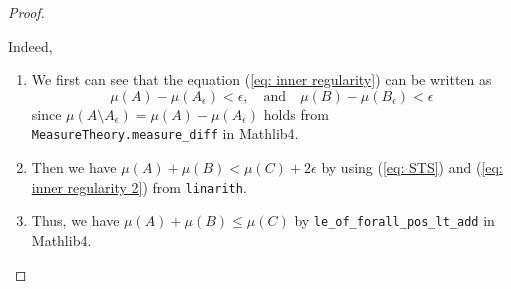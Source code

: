 \begin{proof}
\begin{enumerate}
\begin{enumerate}
            Indeed,
            \begin{enumerate}
            \item
              We first can see that the equation (\ref{eq: inner regularity}) can be written as
              \begin{equation}
                \mu(A)-\mu(A_\epsilon) < \epsilon, \quad \text{and} \quad \mu(B) - \mu(B_\epsilon) < \epsilon
                \label{eq: inner regularity 2}
              \end{equation}
              since \(\mu(A\setminus A_\epsilon) = \mu(A)-\mu(A_\epsilon)\) holds from \texttt{MeasureTheory.measure\_diff} in Mathlib4.

            \item Then we have \(\mu(A) + \mu(B) < \mu(C) + 2\epsilon\) by using (\ref{eq: STS}) and (\ref{eq: inner regularity 2}) from \texttt{linarith}.

            \item Thus, we have \(\mu(A) + \mu(B) \leq \mu(C)\) by \texttt{le\_of\_forall\_pos\_lt\_add} in Mathlib4.
            \end{enumerate}
        \end{enumerate}








\end{enumerate}
\end{proof}
